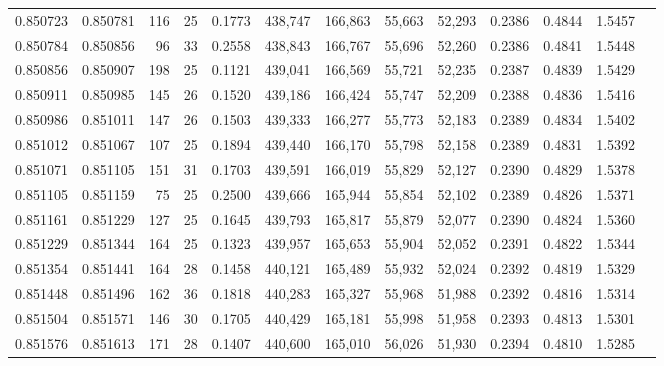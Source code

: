 \begin{tabular}{rrrrrrrrrrrrr}
0.850723 & 0.850781 &   116 &  25 &                                     0.1773 & 438,747 & 166,863 &  55,663 &  52,293 & 0.2386 & 0.4844 & 1.5457 \\
0.850784 & 0.850856 &    96 &  33 &                                     0.2558 & 438,843 & 166,767 &  55,696 &  52,260 & 0.2386 & 0.4841 & 1.5448 \\
0.850856 & 0.850907 &   198 &  25 &                                     0.1121 & 439,041 & 166,569 &  55,721 &  52,235 & 0.2387 & 0.4839 & 1.5429 \\
0.850911 & 0.850985 &   145 &  26 &                                     0.1520 & 439,186 & 166,424 &  55,747 &  52,209 & 0.2388 & 0.4836 & 1.5416 \\
0.850986 & 0.851011 &   147 &  26 &                                     0.1503 & 439,333 & 166,277 &  55,773 &  52,183 & 0.2389 & 0.4834 & 1.5402 \\
0.851012 & 0.851067 &   107 &  25 &                                     0.1894 & 439,440 & 166,170 &  55,798 &  52,158 & 0.2389 & 0.4831 & 1.5392 \\
0.851071 & 0.851105 &   151 &  31 &                                     0.1703 & 439,591 & 166,019 &  55,829 &  52,127 & 0.2390 & 0.4829 & 1.5378 \\
0.851105 & 0.851159 &    75 &  25 &                                     0.2500 & 439,666 & 165,944 &  55,854 &  52,102 & 0.2389 & 0.4826 & 1.5371 \\
0.851161 & 0.851229 &   127 &  25 &                                     0.1645 & 439,793 & 165,817 &  55,879 &  52,077 & 0.2390 & 0.4824 & 1.5360 \\
0.851229 & 0.851344 &   164 &  25 &                                     0.1323 & 439,957 & 165,653 &  55,904 &  52,052 & 0.2391 & 0.4822 & 1.5344 \\
0.851354 & 0.851441 &   164 &  28 &                                     0.1458 & 440,121 & 165,489 &  55,932 &  52,024 & 0.2392 & 0.4819 & 1.5329 \\
0.851448 & 0.851496 &   162 &  36 &                                     0.1818 & 440,283 & 165,327 &  55,968 &  51,988 & 0.2392 & 0.4816 & 1.5314 \\
0.851504 & 0.851571 &   146 &  30 &                                     0.1705 & 440,429 & 165,181 &  55,998 &  51,958 & 0.2393 & 0.4813 & 1.5301 \\
0.851576 & 0.851613 &   171 &  28 &                                     0.1407 & 440,600 & 165,010 &  56,026 &  51,930 & 0.2394 & 0.4810 & 1.5285 \\

\end{tabular}
